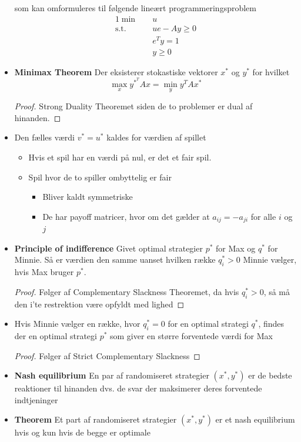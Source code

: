 \begin{itemize}
  som kan omformuleres til følgende lineært programmeringsproblem 
  \begin{alignat*}{1}
    \min \quad  & u \\
    \text{s.t.} \quad &  ue-Ay \geq 0 \\
    & e^T y = 1 \\
    & y \geq 0
  \end{alignat*}
  \item \textbf{Minimax Theorem} Der eksisterer stokastiske vektorer $x^*$ og $y^*$ for hvilket 
  \begin{equation*}
    \max_x y^{*^T} Ax = \min_y y^T A x^*
  \end{equation*}
  \begin{proof} 
    Strong Duality Theoremet siden de to problemer er dual af hinanden. 
  \end{proof}
  \item Den fælles værdi $v^* = u^*$ kaldes for værdien af spillet 
  \begin{itemize}
  	\item Hvis et spil har en værdi på nul, er det et fair spil.
    \item Spil hvor de to spiller ombyttelig er fair
    \begin{itemize}
    	\item Bliver kaldt symmetriske 
      \item De har payoff matricer, hvor om det gælder at $a_{ij} = -a_{ji}$ for alle $i$ og $j$
    \end{itemize}
  \end{itemize} 
  \item \textbf{Principle of indifference} Givet optimal strategier $p^*$ for Max og $q^*$ for Minnie. Så er værdien den samme uanset hvilken række $q^*_i > 0$ Minnie vælger, hvis Max bruger $p^*$.
  \begin{proof} 
    Følger af Complementary Slackness Theoremet, da hvis $q_i^*>0$, så må den i'te restrektion være opfyldt med lighed 
  \end{proof}
  \item Hvis Minnie vælger en række, hvor $q_i^*=0$ for en optimal strategi $q^*$, findes der en optimal strategi $p^*$ som giver en større forventede værdi for Max
  \begin{proof} 
    Følger af Strict Complementary Slackness
  \end{proof}
  \item \textbf{Nash equilibrium} En par af randomiseret strategier $(x^*, y^*)$ er de bedste reaktioner til hinanden dvs. de svar der maksimerer deres forventede indtjeninger
  \item \textbf{Theorem} Et part af randomiseret strategier $(x^*,y^*)$ er et nash equilibrium hvis og kun hvis de begge er optimale
\end{itemize}

